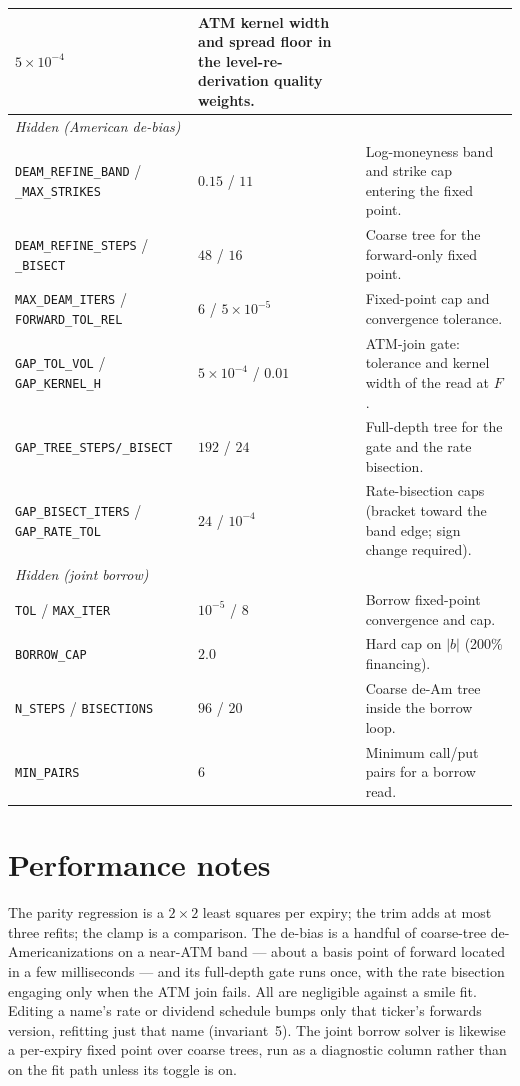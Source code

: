 \documentclass[11pt]{article}
\begin{document}
\begin{longtable}{p{}p{}p{}}
$5\times10^{-4}$ & ATM kernel width and spread floor in the
level-re-derivation quality weights.\\
\midrule
\multicolumn{3}{l}{\emph{Hidden (American de-bias)}}\\ \midrule
\texttt{DEAM\_REFINE\_BAND} / \texttt{\_MAX\_STRIKES} & $0.15$ / $11$ &
Log-moneyness band and strike cap entering the fixed point.\\
\texttt{DEAM\_REFINE\_STEPS} / \texttt{\_BISECT} & $48$ / $16$ & Coarse
tree for the forward-only fixed point.\\
\texttt{MAX\_DEAM\_ITERS} / \texttt{FORWARD\_TOL\_REL} & $6$ /
$5\times10^{-5}$ & Fixed-point cap and convergence tolerance.\\
\texttt{GAP\_TOL\_VOL} / \texttt{GAP\_KERNEL\_H} & $5\times10^{-4}$ /
$0.01$ & ATM-join gate: tolerance and kernel width of the read at $F$.\\
\texttt{GAP\_TREE\_STEPS/\_BISECT} & $192$ / $24$ & Full-depth tree for
the gate and the rate bisection.\\
\texttt{GAP\_BISECT\_ITERS} / \texttt{GAP\_RATE\_TOL} & $24$ / $10^{-4}$
& Rate-bisection caps (bracket toward the band edge; sign change
required).\\
\midrule
\multicolumn{3}{l}{\emph{Hidden (joint borrow)}}\\ \midrule
\texttt{TOL} / \texttt{MAX\_ITER} & $10^{-5}$ / $8$ & Borrow fixed-point
convergence and cap.\\
\texttt{BORROW\_CAP} & $2.0$ & Hard cap on $|b|$ (200\% financing).\\
\texttt{N\_STEPS} / \texttt{BISECTIONS} & $96$ / $20$ & Coarse de-Am tree
inside the borrow loop.\\
\texttt{MIN\_PAIRS} & $6$ & Minimum call/put pairs for a borrow read.\\
\bottomrule
\end{longtable}

\section{Performance notes}
\label{app:perf}

The parity regression is a $2\times2$ least squares per expiry; the trim
adds at most three refits; the clamp is a comparison.  The de-bias is a
handful of coarse-tree de-Americanizations on a near-ATM band --- about a
basis point of forward located in a few milliseconds --- and its
full-depth gate runs once, with the rate bisection engaging only when the
ATM join fails.  All are negligible against a smile fit.  Editing a
name's rate or dividend schedule bumps only that ticker's forwards
version, refitting just that name (invariant~5).  The joint borrow solver
is likewise a per-expiry fixed point over coarse trees, run as a
diagnostic column rather than on the fit path unless its toggle is on.
\end{document}
